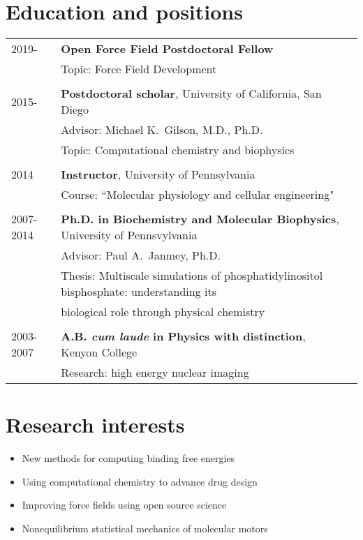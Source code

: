 \documentclass[letterpaper,11pt]{article}
\begin{document}
\maketitle
 
\section{Education and positions}
\begin{tabular}{lll}
2019- & \textbf{Open Force Field Postdoctoral Fellow}\\
             & Topic: Force Field Development \\
             \\
2015- & \textbf{Postdoctoral scholar}, University of California, San Diego\\
             & Advisor: Michael K.~Gilson, M.D., Ph.D.\\
             & Topic: Computational chemistry and biophysics\\
             \\
2014         & \textbf{Instructor}, University of Pennsylvania \\
             & Course: ``Molecular physiology and cellular engineering"\\
             \\
2007-2014 & \textbf{Ph.D. in Biochemistry and Molecular Biophysics}, University of Pennsvylvania \\
          & Advisor: Paul A.~Janmey, Ph.D. \\ 
          & Thesis: 
Multiscale simulations of phosphatidylinositol bisphosphate: understanding its \\ & biological role through physical chemistry \\
\\
2003-2007 & \textbf{A.B. \textit{cum laude} in Physics with distinction}, Kenyon College \\
          & Research: high energy nuclear imaging
\end{tabular}

\section{Research interests}
\begin{itemize}
    \item New methods for computing binding free energies
    \item Using computational chemistry to advance drug design  
    \item Improving force fields using open source science
    \item Nonequilibrium statistical mechanics of molecular motors

\end{itemize}
\end{document}
